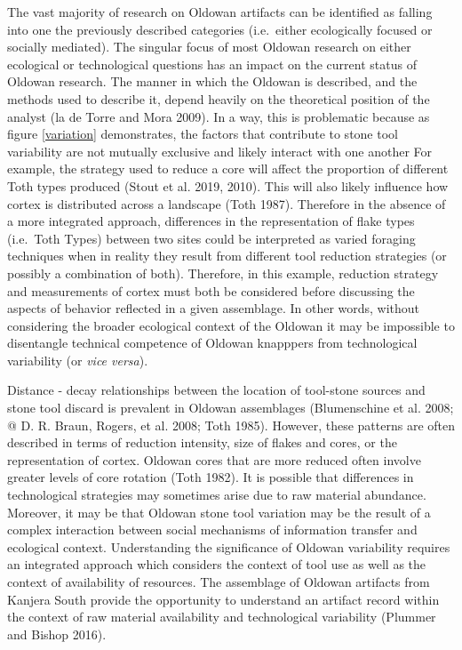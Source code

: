 \documentclass[]{elsarticle} %
\begin{document}
The vast majority of research on Oldowan artifacts can be identified as
falling into one the previously described categories (i.e.~either
ecologically focused or socially mediated). The singular focus of most
Oldowan research on either ecological or technological questions has an
impact on the current status of Oldowan research. The manner in which
the Oldowan is described, and the methods used to describe it, depend
heavily on the theoretical position of the analyst (la de Torre and Mora
2009). In a way, this is problematic because as figure \ref{variation}
demonstrates, the factors that contribute to stone tool variability are
not mutually exclusive and likely interact with one another For example,
the strategy used to reduce a core will affect the proportion of
different Toth types produced (Stout et al. 2019, 2010). This will also
likely influence how cortex is distributed across a landscape (Toth
1987). Therefore in the absence of a more integrated approach,
differences in the representation of flake types (i.e.~Toth Types)
between two sites could be interpreted as varied foraging techniques
when in reality they result from different tool reduction strategies (or
possibly a combination of both). Therefore, in this example, reduction
strategy and measurements of cortex must both be considered before
discussing the aspects of behavior reflected in a given assemblage. In
other words, without considering the broader ecological context of the
Oldowan it may be impossible to disentangle technical competence of
Oldowan knapppers from technological variability (or \emph{vice versa}).

Distance - decay relationships between the location of tool-stone
sources and stone tool discard is prevalent in Oldowan assemblages
(Blumenschine et al. 2008; @ D. R. Braun, Rogers, et al. 2008; Toth
1985). However, these patterns are often described in terms of reduction
intensity, size of flakes and cores, or the representation of cortex.
Oldowan cores that are more reduced often involve greater levels of core
rotation (Toth 1982). It is possible that differences in technological
strategies may sometimes arise due to raw material abundance. Moreover,
it may be that Oldowan stone tool variation may be the result of a
complex interaction between social mechanisms of information transfer
and ecological context. Understanding the significance of Oldowan
variability requires an integrated approach which considers the context
of tool use as well as the context of availability of resources. The
assemblage of Oldowan artifacts from Kanjera South provide the
opportunity to understand an artifact record within the context of raw
material availability and technological variability (Plummer and Bishop
2016).
\end{document}
